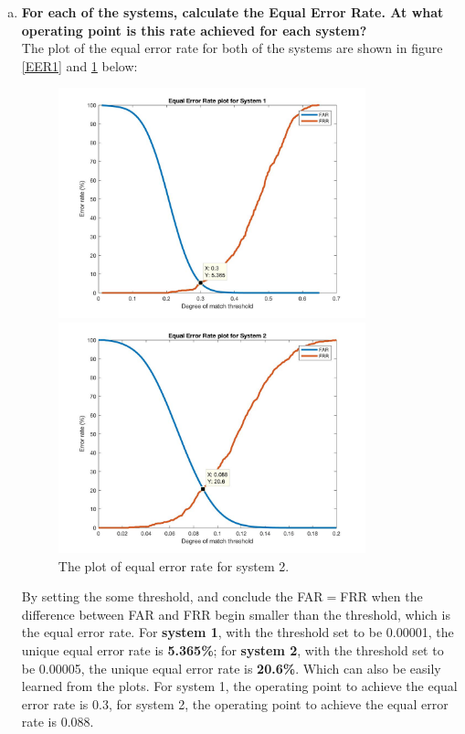 \documentclass[a4paper]{article}
\begin{document}
\begin{spacing}{2.0}
\begin{enumerate}[(a)]
	\item \textbf{For each of the systems, calculate the Equal Error Rate. At what operating point is this rate 		achieved for each system?}\\
	The plot of the equal error rate for both of the systems are shown in figure \ref{EER1} and \ref{EER2} below:
	\begin{figure}[h]
	\begin{minipage}[t]{0.5\linewidth}
	\centering
	\includegraphics[width = 3.5in]{EER1.jpg}
	\caption{The plot of equal error rate for system 1.}
	\label{EER1}
	\end{minipage}
	\begin{minipage}[t]{0.5\linewidth}
	\centering
	\includegraphics[width = 3.5in]{EER2.jpg}
	\caption{The plot of equal error rate for system 2.}
	\label{EER2}
	\end{minipage}
	\end{figure}
	By setting the some threshold, and conclude the FAR$=$FRR when the difference between FAR and FRR begin smaller than the threshold, which is the equal error rate. For \textbf{system 1}, with the threshold set to be 0.00001, the unique equal error rate is \textbf{5.365\%}; for \textbf{system 2}, with the threshold set to be 0.00005, the unique equal error rate is \textbf{20.6\%}. Which can also be easily learned from the plots. For system 1, the operating point to achieve the equal error rate is 0.3, for system 2, the operating point to achieve the equal error rate is 0.088.
	

\end{enumerate}
\end{spacing}
\end{document}
